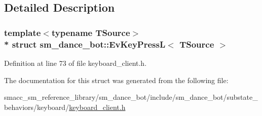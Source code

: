 \subsection{Detailed Description}
\subsubsection*{template$<$typename T\+Source$>$\\*
struct sm\+\_\+dance\+\_\+bot\+::\+Ev\+Key\+Press\+L$<$ T\+Source $>$}



Definition at line 73 of file keyboard\+\_\+client.\+h.



The documentation for this struct was generated from the following file\+:\begin{DoxyCompactItemize}
\item 
smacc\+\_\+sm\+\_\+reference\+\_\+library/sm\+\_\+dance\+\_\+bot/include/sm\+\_\+dance\+\_\+bot/substate\+\_\+behaviors/keyboard/\hyperlink{keyboard__client_8h}{keyboard\+\_\+client.\+h}\end{DoxyCompactItemize}
